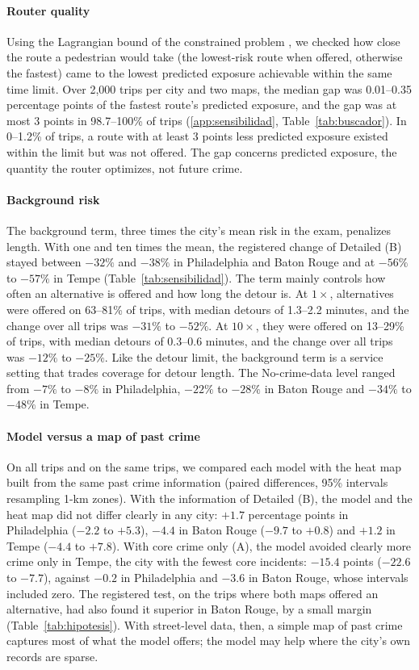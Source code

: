 \documentclass[preprint,12pt,authoryear]{elsarticle}
\begin{document}
\paragraph{Router quality} Using the Lagrangian bound of the constrained problem \citep{handler1980dual}, we checked how close the route a pedestrian would take (the lowest-risk route when offered, otherwise the fastest) came to the lowest predicted exposure achievable within the same time limit. Over 2,000 trips per city and two maps, the median gap was 0.01--0.35 percentage points of the fastest route's predicted exposure, and the gap was at most 3 points in 98.7--100\% of trips (\ref{app:sensibilidad}, Table~\ref{tab:buscador}). In 0--1.2\% of trips, a route with at least 3 points less predicted exposure existed within the limit but was not offered. The gap concerns predicted exposure, the quantity the router optimizes, not future crime.

\paragraph{Background risk} The background term, three times the city's mean risk in the exam, penalizes length. With one and ten times the mean, the registered change of Detailed (B) stayed between $-32\%$ and $-38\%$ in Philadelphia and Baton Rouge and at $-56\%$ to $-57\%$ in Tempe (Table~\ref{tab:sensibilidad}). The term mainly controls how often an alternative is offered and how long the detour is. At $1\times$, alternatives were offered on 63--81\% of trips, with median detours of 1.3--2.2 minutes, and the change over all trips was $-31\%$ to $-52\%$. At $10\times$, they were offered on 13--29\% of trips, with median detours of 0.3--0.6 minutes, and the change over all trips was $-12\%$ to $-25\%$. Like the detour limit, the background term is a service setting that trades coverage for detour length. The No-crime-data level ranged from $-7\%$ to $-8\%$ in Philadelphia, $-22\%$ to $-28\%$ in Baton Rouge and $-34\%$ to $-48\%$ in Tempe.

\paragraph{Model versus a map of past crime} On all trips and on the same trips, we compared each model with the heat map built from the same past crime information (paired differences, 95\% intervals resampling 1-km zones). With the information of Detailed (B), the model and the heat map did not differ clearly in any city: $+1.7$ percentage points in Philadelphia ($-2.2$ to $+5.3$), $-4.4$ in Baton Rouge ($-9.7$ to $+0.8$) and $+1.2$ in Tempe ($-4.4$ to $+7.8$). With core crime only (A), the model avoided clearly more crime only in Tempe, the city with the fewest core incidents: $-15.4$ points ($-22.6$ to $-7.7$), against $-0.2$ in Philadelphia and $-3.6$ in Baton Rouge, whose intervals included zero. The registered test, on the trips where both maps offered an alternative, had also found it superior in Baton Rouge, by a small margin (Table~\ref{tab:hipotesis}). With street-level data, then, a simple map of past crime captures most of what the model offers; the model may help where the city's own records are sparse.
\end{document}
